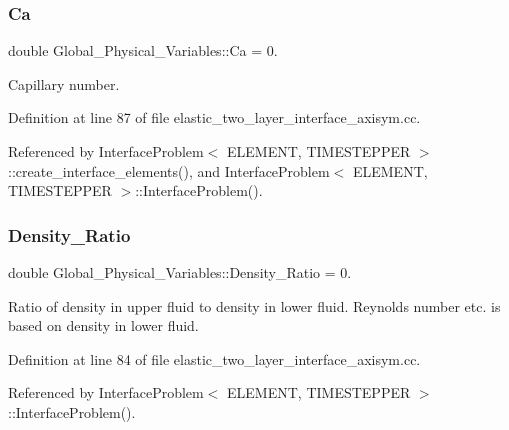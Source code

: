 \subsubsection{\texorpdfstring{Ca}{Ca}}
{\footnotesize\ttfamily double Global\+\_\+\+Physical\+\_\+\+Variables\+::\+Ca = 0.}



Capillary number. 



Definition at line 87 of file elastic\+\_\+two\+\_\+layer\+\_\+interface\+\_\+axisym.\+cc.



Referenced by Interface\+Problem$<$ E\+L\+E\+M\+E\+N\+T, T\+I\+M\+E\+S\+T\+E\+P\+P\+E\+R $>$\+::create\+\_\+interface\+\_\+elements(), and Interface\+Problem$<$ E\+L\+E\+M\+E\+N\+T, T\+I\+M\+E\+S\+T\+E\+P\+P\+E\+R $>$\+::\+Interface\+Problem().

\mbox{\label{namespaceGlobal__Physical__Variables_a80a34b6dfb7e1501966b8d6c7501e718}} 
\subsubsection{\texorpdfstring{Density\+\_\+\+Ratio}{Density\_Ratio}}
{\footnotesize\ttfamily double Global\+\_\+\+Physical\+\_\+\+Variables\+::\+Density\+\_\+\+Ratio = 0.}



Ratio of density in upper fluid to density in lower fluid. Reynolds number etc. is based on density in lower fluid. 



Definition at line 84 of file elastic\+\_\+two\+\_\+layer\+\_\+interface\+\_\+axisym.\+cc.



Referenced by Interface\+Problem$<$ E\+L\+E\+M\+E\+N\+T, T\+I\+M\+E\+S\+T\+E\+P\+P\+E\+R $>$\+::\+Interface\+Problem().

\mbox{\label{namespaceGlobal__Physical__Variables_a3962c36313826b19f216f6bbbdd6a477}} 
